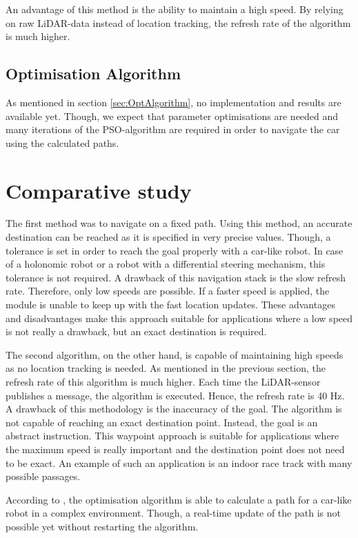 \documentclass[conference,a4paper]{IEEEtran}
\begin{document}
An advantage of this method is the ability to maintain a high speed. By relying on raw LiDAR-data instead of location tracking, the refresh rate of the algorithm is much higher. 

\subsection{Optimisation Algorithm}
As mentioned in section \ref{sec:OptAlgorithm}, no implementation and results are available yet. Though, we expect that parameter optimisations are needed and many iterations of the PSO-algorithm are required in order to navigate the car using the calculated paths.

\section{Comparative study}
\label{sec:ComparativeStudy}
The first method was to navigate on a fixed path. Using this method, an accurate destination can be reached as it is specified in very precise values. Though, a tolerance is set in order to reach the goal properly with a car-like robot. In case of a holonomic robot or a robot with a differential steering mechanism, this tolerance is not required. A drawback of this navigation stack is the slow refresh rate. Therefore, only low speeds are possible. If a faster speed is applied, the module is unable to keep up with the fast location updates. These advantages and disadvantages make this approach suitable for applications where a low speed is not really a drawback, but an exact destination is required.

The second algorithm, on the other hand, is capable of maintaining high speeds as no location tracking is needed. As mentioned in the previous section, the refresh rate of this algorithm is much higher. Each time the LiDAR-sensor publishes a message, the algorithm is executed. Hence, the refresh rate is 40 Hz. A drawback of this methodology is the inaccuracy of the goal. The algorithm is not capable of reaching an exact destination point. Instead, the goal is an abstract instruction. This waypoint approach is suitable for applications where the maximum speed is really important and the destination point does not need to be exact. An example of such an application is an indoor race track with many possible passages.

According to \cite{Saska2006}, the optimisation algorithm is able to calculate a path for a car-like robot in a complex environment. Though, a real-time update of the path is not possible yet without restarting the algorithm. 
\end{document}
